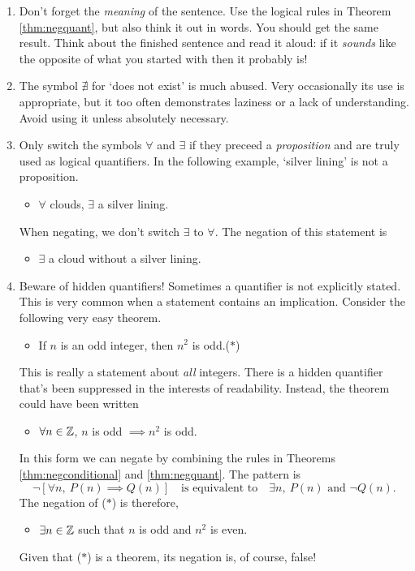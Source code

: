 \begin{enumerate}
  \item Don't forget the \emph{meaning} of the sentence. Use the logical rules in Theorem \ref{thm:negquant}, but also think it out in words. You should get the same result. Think about the finished sentence and read it aloud: if it \emph{sounds} like the opposite of what you started with then it probably is!
  \item The symbol $\nexists$ for `does not exist' is much abused. Very occasionally its use is appropriate, but it too often demonstrates laziness or a lack of understanding. Avoid using it unless absolutely necessary.
  \item Only switch the symbols $\forall$ and $\exists$ if they preceed a \emph{proposition} and are truly used as logical quantifiers. In the following example, `silver lining' is not a proposition.
  \begin{itemize}\setlength{\itemsep}{0pt}
    \item[] $\forall$ clouds, $\exists$ a silver lining.
  \end{itemize}
	When negating, we don't switch $\exists$ to $\forall$. The negation of this statement is
	\begin{itemize}\setlength{\itemsep}{0pt}
    \item[] $\exists$ a cloud without a silver lining.
  \end{itemize}
	\item Beware of hidden quantifiers! Sometimes a quantifier is not explicitly stated. This is very common when a statement contains an implication. Consider the following very easy theorem.
	\begin{itemize}\setlength{\itemsep}{0pt}
    \item[] If $n$ is an odd integer, then $n^2$ is odd.\hfill($\ast$)
  \end{itemize}
  This is really a statement about \emph{all} integers. There is a hidden quantifier that's been suppressed in the interests of readability. Instead, the theorem could have been written
 	\begin{itemize}\setlength{\itemsep}{0pt}
    \item[] $\forall n\in\mathbb{Z}$, $n$ is odd $\implies n^2$ is odd.
  \end{itemize}
  In this form we can negate by combining the rules in Theorems \ref{thm:negconditional} and \ref{thm:negquant}. The pattern is
  \[\neg\left[\forall n,\ P(n)\implies Q(n)\right]\quad\text{is equivalent to}\quad \exists n,\ P(n)\text{ and }\neg Q(n).\]
 	The negation of ($\ast$) is therefore,
 	\begin{itemize}\setlength{\itemsep}{0pt}
    \item[] $\exists n\in\mathbb{Z}$ such that $n$ is odd and $n^2$ is even.
  \end{itemize}
  Given that ($\ast$) is a theorem, its negation is, of course, false!
\end{enumerate}

